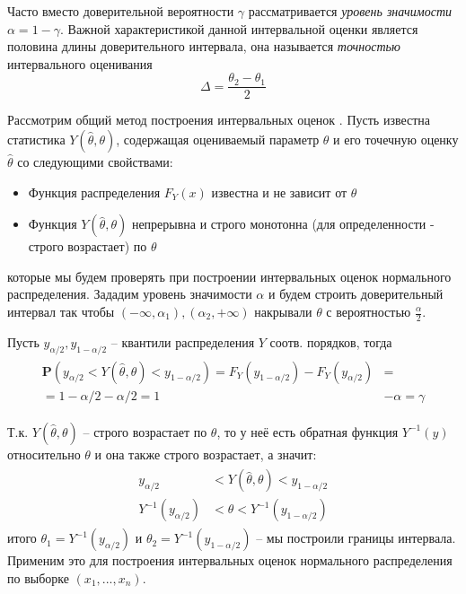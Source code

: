 \documentclass[12pt,a4paper]{article}
\begin{document}
Часто вместо доверительной вероятности $\gamma$ рассматривается  \textit{уровень значимости} $\alpha = 1 - \gamma$. Важной характеристикой данной интервальной оценки является половина длины доверительного интервала, она называется \textit{точностью} интервального оценивания
\begin{equation}
	\Delta = \frac{\theta_2 - \theta_1}{2}
\end{equation}

\label{method}
Рассмотрим общий метод построения интервальных оценок \cite[стр. 456- -- 457]{verrazdely}. Пусть известна статистика $Y(\widehat{\theta}, \theta)$, содержащая оцениваемый параметр $\theta$ и его точечную оценку $\widehat{\theta}$ со следующими свойствами:
\begin{itemize}
	\item Функция распределения $F_Y (x)$ известна и не зависит от $\theta$
	\item Функция $Y (\widehat{\theta}, \theta)$ непрерывна и строго монотонна (для определенности - строго возрастает) по $\theta$
\end{itemize}
которые мы будем проверять при построении интервальных оценок нормального распределения. Зададим уровень значимости $\alpha$ и будем строить доверительный интервал так чтобы $(-\infty, \alpha_1), (\alpha_2, +\infty)$ накрывали $\theta$ с вероятностью $\frac{\alpha}{2}$. 

Пусть $y_{\alpha / 2}, y_{1 - \alpha / 2}$ -- квантили распределения $Y$ соотв. порядков, тогда
\begin{align}
\begin{split}
	\textbf{P}\left(y_{\alpha / 2}<Y(\widehat{\theta}, \theta)<y_{1 - \alpha / 2}\right)=F_{Y}\left(y_{1-\alpha / 2}\right)-F_{Y}\left(y_{\alpha / 2}\right) &=\\
	=1-\alpha / 2-\alpha / 2=1 &-\alpha=\gamma
\end{split}
\end{align}

Т.к. $Y(\widehat{\theta}, \theta)$ -- строго возрастает по $\theta$, то у неё есть обратная функция $Y^{-1}(y)$ относительно $\theta$ и она также строго возрастает, а значит:
\begin{align}
\begin{split}
	y_{\alpha / 2} &< Y(\widehat{\theta}, \theta) < y_{1 - \alpha / 2} \\
	Y^{-1}(y_{\alpha / 2}) &< \theta < Y^{-1}(y_{1 - \alpha / 2})
\end{split}
\end{align}
итого $\theta_1 = Y^{-1}(y_{\alpha / 2})$ и $\theta_2 = Y^{-1}(y_{1 - \alpha / 2})$ -- мы построили границы интервала. Применим это для построения интервальных оценок нормального распределения по выборке $(x_1, ..., x_n)$.
\end{document}

